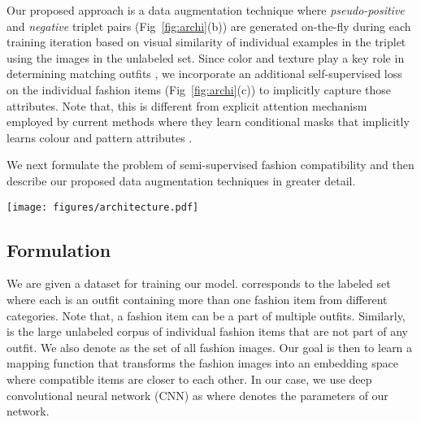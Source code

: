 \documentclass[sigconf]{acmart}
\begin{document}
Our proposed approach is a data augmentation technique where {\em pseudo-positive} and {\em negative} triplet pairs (Fig~\ref{fig:archi}(b)) are generated on-the-fly during each training iteration based on visual similarity of individual examples in the triplet using the images in the unlabeled set. Since color and texture play a key role in determining matching outfits \cite{kim2020self}, we incorporate an additional self-supervised loss on the individual fashion items (Fig~\ref{fig:archi}(c)) to implicitly capture those attributes. Note that, this is different from explicit attention mechanism employed by current methods where they learn conditional masks that implicitly learns colour and pattern attributes \cite{iccv2019learning,cvpr2020fashion}.

 We next formulate the problem of semi-supervised fashion compatibility and then describe our proposed data augmentation techniques in greater detail. 
 
\begin{figure*}
    \centering
    \texttt{[image: figures/architecture.pdf]}
    \caption{{\bf Overview of our proposed approach}. \textbf{A}. Triplet loss  on labeled items: Anchor item , Compatible positive item  and Non-compatible negative item . \textbf{B} Triplet loss  on pseudo-labelled items in the unlabeled item batch . The figure shows visually rich low-dimensional embedding space  where we compose nearest pseudo triplets for training. See Sec. \ref{sec:l_pseudo}. \textbf{C}. Triplet losses  on {\em shape} and {\em appearance} transformed images. See Sec. \ref{sec:l_ss}}
    \label{fig:archi}
\end{figure*}

\subsection{Formulation}
We are given a dataset  for training our model.  corresponds to the labeled set where each   is an outfit containing more than one fashion item from different categories. Note that, a fashion item  can be a part of multiple outfits. Similarly,  is the large unlabeled corpus of individual fashion items that are not part of any outfit.
We also denote  as the set of all fashion images. Our goal is then to learn a mapping function  that transforms the fashion images into an embedding space where compatible items are closer to each other. In our case, we use deep convolutional neural network (\textsc{CNN}) as  where  denotes the parameters of our network.
\end{document}
